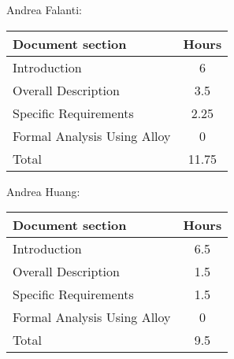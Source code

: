 Andrea Falanti:

\begin{tabular}{|l|c|}
    \hline
    Document section & Hours \\
    \hline
     Introduction & 6\\
     Overall Description & 3.5\\
     Specific Requirements & 2.25\\
     Formal Analysis Using Alloy & 0\\
     \hline
     Total & 11.75\\
     \hline
\end{tabular}
\vskip 0.3in

Andrea Huang:

\begin{tabular}{|l|c|}
    \hline
    Document section & Hours \\
    \hline
     Introduction &  6.5\\
     Overall Description & 1.5\\
     Specific Requirements & 1.5\\
     Formal Analysis Using Alloy & 0\\
     \hline
     Total & 9.5\\
     \hline
\end{tabular}